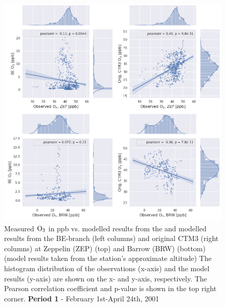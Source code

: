 \begin{figure}[ht]
    \centering
    \includegraphics[width = \linewidth]{Chapter6_Results/images/Orig_BE_comp/jointplot_FebApr_ZEPBRW_O3_2001.png}
    \caption{Measured $\mathrm{O_3}$ in ppb vs. modelled results from the and modelled results from the BE-branch (left columns) and original CTM3 (right columns) at  Zeppelin (ZEP) (top) and Barrow (BRW) (bottom) (model results taken from the station's approximate altitude) The histogram distribution of the observations (x-axis) and the model results (y-axis) are shown on the x- and y-axis, respectively. The Pearson correlation coefficient and p-value is shown in the top right corner. \textbf{Period 1} - February 1st-April 24th, 2001}
    \label{fig:joint_FebApr_ZEPBRW}
\end{figure}